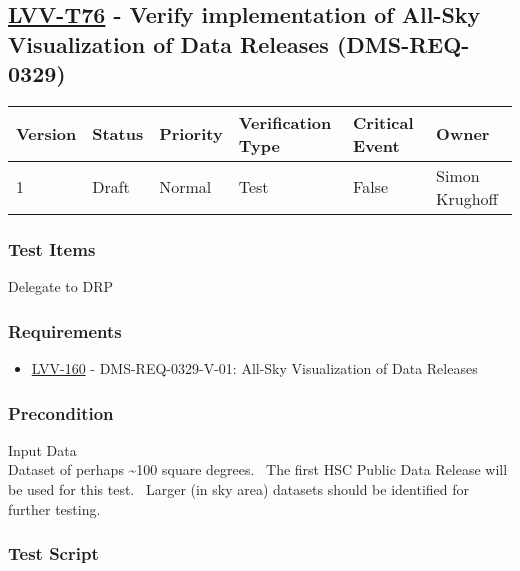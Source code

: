 \hypertarget{lvv-t76---verify-implementation-of-all-sky-visualization-of-data-releases-dms-req-0329}{%
\subsection{\texorpdfstring{\href{https://jira.lsstcorp.org/secure/Tests.jspa\#/testCase/LVV-T76}{LVV-T76}
- Verify implementation of All-Sky Visualization of Data Releases
(DMS-REQ-0329)}{LVV-T76 - Verify implementation of All-Sky Visualization of Data Releases (DMS-REQ-0329)}}\label{lvv-t76---verify-implementation-of-all-sky-visualization-of-data-releases-dms-req-0329}}

\begin{longtable}[]{@{}llllll@{}}
\toprule
Version & Status & Priority & Verification Type & Critical Event &
Owner\tabularnewline
\midrule
\endhead
1 & Draft & Normal & Test & False & Simon Krughoff\tabularnewline
\bottomrule
\end{longtable}

\hypertarget{test-items-52}{%
\subsubsection{Test Items}\label{test-items-52}}

Delegate to DRP

\hypertarget{requirements-53}{%
\subsubsection{Requirements}\label{requirements-53}}

\begin{itemize}
\tightlist
\item
  \href{https://jira.lsstcorp.org/browse/LVV-160}{LVV-160} -
  DMS-REQ-0329-V-01: All-Sky Visualization of Data Releases
\end{itemize}

\hypertarget{precondition-7}{%
\subsubsection{Precondition}\label{precondition-7}}

Input Data\\
Dataset of perhaps \textasciitilde{}100 square degrees. ~The first HSC
Public Data Release will be used for this test. ~Larger (in sky area)
datasets should be identified for further testing.

\hypertarget{test-script-53}{%
\subsubsection{Test Script}\label{test-script-53}}

